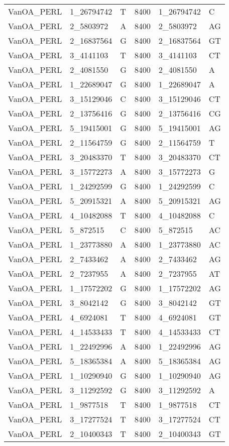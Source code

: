 \begin{center}
\begin{longtable}{|l|l|l|l|l|l|}
VanOA\_PERL&1\_26794742&T&8400&1\_26794742&C\\
VanOA\_PERL&2\_5803972&A&8400&2\_5803972&AG\\
VanOA\_PERL&2\_16837564&G&8400&2\_16837564&GT\\
VanOA\_PERL&3\_4141103&T&8400&3\_4141103&CT\\
VanOA\_PERL&2\_4081550&G&8400&2\_4081550&A\\
VanOA\_PERL&1\_22689047&G&8400&1\_22689047&A\\
VanOA\_PERL&3\_15129046&C&8400&3\_15129046&CT\\
VanOA\_PERL&2\_13756416&G&8400&2\_13756416&CG\\
VanOA\_PERL&5\_19415001&G&8400&5\_19415001&AG\\
VanOA\_PERL&2\_11564759&G&8400&2\_11564759&T\\
VanOA\_PERL&3\_20483370&T&8400&3\_20483370&CT\\
VanOA\_PERL&3\_15772273&A&8400&3\_15772273&G\\
VanOA\_PERL&1\_24292599&G&8400&1\_24292599&C\\
VanOA\_PERL&5\_20915321&A&8400&5\_20915321&AG\\
VanOA\_PERL&4\_10482088&T&8400&4\_10482088&C\\
VanOA\_PERL&5\_872515&C&8400&5\_872515&AC\\
VanOA\_PERL&1\_23773880&A&8400&1\_23773880&AC\\
VanOA\_PERL&2\_7433462&A&8400&2\_7433462&AG\\
VanOA\_PERL&2\_7237955&A&8400&2\_7237955&AT\\
VanOA\_PERL&1\_17572202&G&8400&1\_17572202&AG\\
VanOA\_PERL&3\_8042142&G&8400&3\_8042142&GT\\
VanOA\_PERL&4\_6924081&T&8400&4\_6924081&GT\\
VanOA\_PERL&4\_14533433&T&8400&4\_14533433&CT\\
VanOA\_PERL&1\_22492996&A&8400&1\_22492996&AG\\
VanOA\_PERL&5\_18365384&A&8400&5\_18365384&AG\\
VanOA\_PERL&1\_10290940&G&8400&1\_10290940&AG\\
VanOA\_PERL&3\_11292592&G&8400&3\_11292592&A\\
VanOA\_PERL&1\_9877518&T&8400&1\_9877518&CT\\
VanOA\_PERL&3\_17277524&T&8400&3\_17277524&CT\\
VanOA\_PERL&2\_10400343&T&8400&2\_10400343&GT\\

\end{longtable}
\end{center}
